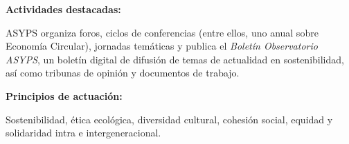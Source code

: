 \begin{solution}
	\medskip

	\textbf{Actividades destacadas:}

	ASYPS organiza foros, ciclos de conferencias (entre ellos, uno anual sobre Economía Circular),
	jornadas temáticas y publica el \textit{Boletín Observatorio ASYPS}, un boletín digital de
	difusión de temas de actualidad en sostenibilidad, así como tribunas de opinión y documentos
	de trabajo.

	\medskip

	\textbf{Principios de actuación:}

	Sostenibilidad, ética ecológica, diversidad cultural, cohesión social, equidad y solidaridad
	intra e intergeneracional.

\end{solution}
